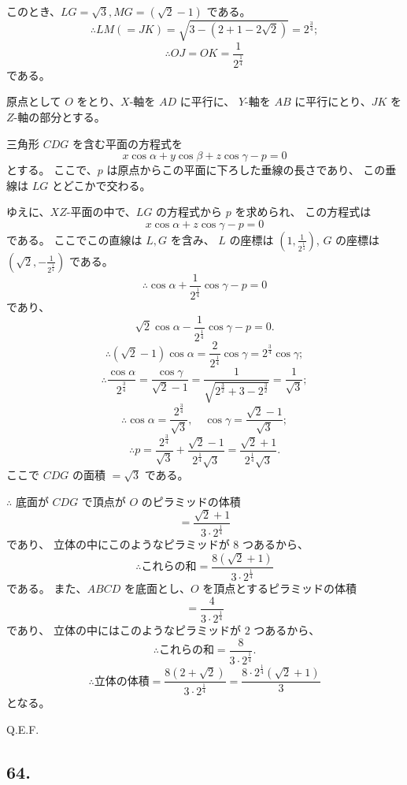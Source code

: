 このとき、$LG = \sqrt{3}, MG = (\sqrt{2} - 1)$ である。
\[
\therefore
LM ( = JK) = \sqrt{3 - (2 + 1 - 2\sqrt{2})}
 = 2^{\frac{3}{4}};
\]
\[
\therefore
OJ = OK = \frac{1}{2^{\frac{1}{4}}}
\]
である。

原点として $O$ をとり、$X$-軸を $AD$ に平行に、
$Y$-軸を $AB$ に平行にとり、$JK$ を $Z$-軸の部分とする。

三角形 $CDG$ を含む平面の方程式を
\[
x \cos \alpha + y \cos \beta + z \cos \gamma - p = 0
\]
とする。
ここで、$p$ は原点からこの平面に下ろした垂線の長さであり、
この垂線は $LG$ とどこかで交わる。

ゆえに、$XZ$-平面の中で、$LG$ の方程式から $p$ を求められ、
この方程式は
\[
x \cos \alpha + z \cos \gamma - p = 0
\]
である。
ここでこの直線は $L, G$ を含み、
$L$ の座標は $\left( 1, \frac{1}{2^{\frac{1}{4}}} \right)$,
$G$ の座標は $\left( \sqrt{2}, -\frac{1}{2^{\frac{1}{4}}} \right)$
である。
\[
\therefore
\cos \alpha + \frac{1}{2^{\frac{1}{4}}} \cos \gamma - p = 0
\]
であり、
\[
\sqrt{2} \cos \alpha -\frac{1}{2^{\frac{1}{4}}} \cos \gamma - p = 0.
\]
\[
\therefore
(\sqrt{2} - 1) \cos \alpha
= \frac{2}{2^{\frac{1}{4}}} \cos \gamma
= 2^{\frac{3}{4}} \cos \gamma;
\]
\[
\therefore
\frac{\cos \alpha}{2^{\frac{3}{4}}}
= \frac{\cos \gamma}{\sqrt{2} - 1}
= \frac{1}{\sqrt{2^{\frac{3}{2}} + 3 - 2^{\frac{3}{2}}}}
= \frac{1}{\sqrt{3}};
\]
\[
\therefore
\cos \alpha = \frac{2^{\frac{3}{4}}}{\sqrt{3}},
\quad
\cos \gamma = \frac{\sqrt{2} - 1}{\sqrt{3}};
\]
\[
\therefore
p = \frac{2^{\frac{3}{4}}}{\sqrt{3}}
 + \frac{\sqrt{2} - 1}{2^{\frac{1}{4}}\sqrt{3}}
= \frac{\sqrt{2} + 1}{2^{\frac{1}{4}}\sqrt{3}}.
\]
ここで $CDG$ の面積 $= \sqrt{3}$ である。

$\therefore$ 底面が $CDG$ で頂点が $O$ のピラミッドの体積
\[
= \frac{\sqrt{2} + 1}{3 \cdot 2^{\frac{1}{4}}}
\]
であり、
立体の中にこのようなピラミッドが $8$ つあるから、
\[
\therefore
\mbox{これらの和} = \frac{8(\sqrt{2} + 1)}{3 \cdot 2^{\frac{1}{4}}}
\]
である。
また、$ABCD$ を底面とし、$O$ を頂点とするピラミッドの体積
\[
=  \frac{4}{3 \cdot 2^{\frac{1}{4}}}
\]
であり、
立体の中にはこのようなピラミッドが $2$ つあるから、
\[
\therefore
\mbox{これらの和} = \frac{8}{3 \cdot 2^{\frac{1}{4}}}.
\]
\[
\therefore
\mbox{立体の体積}
= \frac{8(2 + \sqrt{2})}{3 \cdot 2^{\frac{1}{4}}}
= \frac{8 \cdot 2^{\frac{1}{4}} (\sqrt{2} + 1)}{3}
\]
となる。

Q.E.F.

\subsection*{64.}

